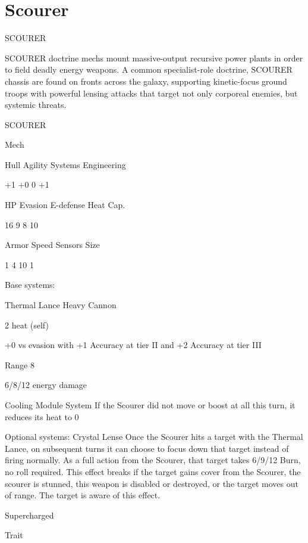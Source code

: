 \section{Scourer}

                                              SCOURER  

SCOURER doctrine mechs mount massive-output recursive power plants in order to field deadly  
energy weapons. A common specialist-role doctrine, SCOURER chassis are found on fronts  
across the galaxy, supporting kinetic-focus ground troops with powerful lensing attacks that  
target not only corporeal enemies, but systemic threats. 
 

 SCOURER 

 Mech 

 Hull       Agility     Systems       Engineering 

 +1         +0           0            +1 

 HP         Evasion      E-defense    Heat Cap. 

 16         9            8            10 

 Armor      Speed       Sensors       Size 

 1          4            10           1 

Base systems:
 
Thermal Lance  
Heavy Cannon
 
2 heat (self)
 
+0 vs evasion with +1 Accuracy at tier II and +2 Accuracy at tier III
 
Range 8
 
6/8/12 energy damage
 

Cooling Module  
System  
If the Scourer did not move or boost at all this turn, it reduces its heat to 0
 

Optional systems:  
Crystal Lense  
Once the Scourer hits a target with the Thermal Lance, on subsequent turns it can choose to  
focus down that target instead of firing normally. As a full action from the Scourer, that target  
takes 6/9/12 Burn, no roll required. This effect breaks if the target gains cover from the Scourer,  
the scourer is stunned, this weapon is disabled or destroyed, or the target moves out of range.  
The target is aware of this effect.
 

Supercharged
 
Trait
 

                                                                                                         


